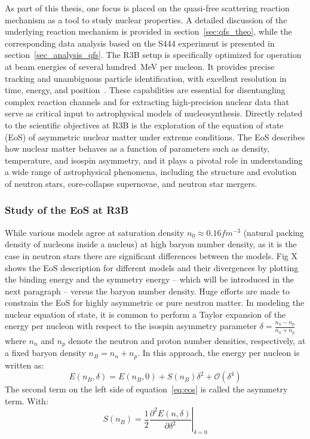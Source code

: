 As part of this thesis, one focus is placed on the quasi-free scattering reaction mechanism as a tool to study nuclear properties. A detailed discussion of the underlying reaction mechanism is provided in section~\ref{sec:qfs_theo}, while the corresponding data analysis based on the S444 experiment is presented in section~\ref{sec_analysis_qfs}.\newline
The R3B setup is specifically optimized for operation at beam energies of several hundred~MeV per nucleon. It provides precise tracking and unambiguous particle identification, with excellent resolution in time, energy, and position~\cite{heil2022new}. These capabilities are essential for disentangling complex reaction channels and for extracting high-precision nuclear data that serve as critical input to astrophysical models of nucleosynthesis.\newline
Directly related to the scientific objectives at R3B is the exploration of the equation of state (EoS) of asymmetric nuclear matter under extreme conditions. The EoS describes how nuclear matter behaves as a function of parameters such as density, temperature, and isospin asymmetry, and it plays a pivotal role in understanding a wide range of astrophysical phenomena, including the structure and evolution of neutron stars, core-collapse supernovae, and neutron star mergers.\newline

\subsubsection{Study of the EoS at R3B}

While various models agree at saturation density $n_0 \approx 0.16 fm^{-3}$  (natural packing density of nucleons inside a nucleus) at high baryon number density, as it is the case in neutron stars there are significant differences between the models. Fig X shows the EoS description for different models and their divergences by plotting the binding energy and the symmetry energy -- which will be introduced in the next paragraph -- versus the baryon number density. 
Huge efforts are made to constrain the EoS for highly asymmetric or pure neutron matter. \newline
In modeling the nuclear equation of state, it is common to perform a Taylor expansion of the energy per nucleon with respect to the isospin asymmetry parameter $\delta = \frac{n_n -n_p}{n_n + n_p}$ where $n_n$ and $n_p$ denote the neutron and proton number densities, respectively, at a fixed baryon density $n_B = n_n +n_p$. In this approach, the energy per nucleon is written as:
\begin{equation}\label{eq:eos}
E(n_B,\delta)=E(n_B,0)+S(n_B)\delta^2+\mathcal{O}(\delta^4)
\end{equation}
The second term on the left side of equation~\ref{eq:eos}  is called the asymmetry term. With:
\begin{equation}
S(n_B) = \frac{1}{2} \left. \frac{\partial^2 E(n, \delta)}{\partial \delta^2} \right|_{\delta = 0}
\end{equation}

